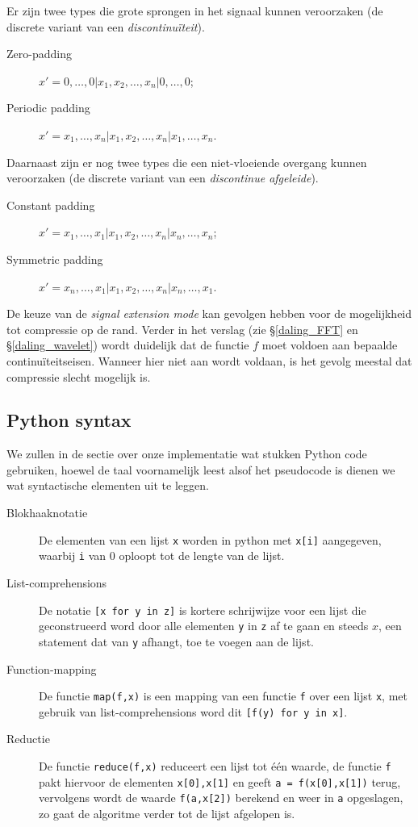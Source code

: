 Er zijn twee types die grote sprongen in het signaal kunnen veroorzaken (de discrete variant van een \emph{discontinu\"iteit}).
\begin{description}
\item[Zero-padding] $x' = 0, \ldots, 0| x_1, x_2, \ldots, x_n| 0, \ldots, 0$;
\item[Periodic padding] $x' = x_1, \ldots, x_n| x_1, x_2, \ldots, x_n| x_1, \ldots, x_n$.
\end{description}
Daarnaast zijn er nog twee types die een niet-vloeiende overgang kunnen veroorzaken (de discrete variant van een \emph{discontinue afgeleide}).
\begin{description}
\item[Constant padding] $x' = x_1, \ldots, x_1| x_1, x_2, \ldots, x_n| x_n, \ldots, x_n$;
\item[Symmetric padding] $x' = x_n, \ldots, x_1| x_1, x_2, \ldots, x_n| x_n, \ldots, x_1$.
\end{description}

De keuze van de \emph{signal extension mode} kan gevolgen hebben voor de mogelijkheid tot compressie op de rand. Verder in het verslag (zie \S \ref{daling_FFT} en \S \ref{daling_wavelet}) wordt duidelijk dat de functie $f$ moet voldoen aan bepaalde continu\"iteitseisen. Wanneer hier niet aan wordt voldaan, is het gevolg meestal dat compressie slecht mogelijk is.

\subsection{Python syntax}
\label{python}
We zullen in de sectie over onze implementatie wat stukken Python code gebruiken, hoewel de taal
voornamelijk leest alsof het pseudocode is dienen we wat syntactische elementen uit te leggen.
\begin{description}
\item[Blokhaaknotatie] De elementen van een lijst \texttt{x} worden in python met \texttt{x[i]} aangegeven,
  waarbij \texttt{i} van $0$ oploopt tot de lengte van de lijst.
\item[List-comprehensions] De notatie \texttt{[x for y in z]} is kortere schrijwijze voor een lijst die geconstrueerd
  word door alle elementen \texttt{y} in \texttt{z} af te gaan en steeds 
  $x$, een statement dat van \texttt{y} afhangt, toe te voegen aan de lijst.
\item[Function-mapping] De functie \texttt{map(f,x)} is een mapping van een functie \texttt{f} over een lijst 
  \texttt{x}, met gebruik van list-comprehensions word dit \texttt{[f(y) for y in x]}.
\item[Reductie] De functie \texttt{reduce(f,x)} reduceert een lijst tot \'e\'en waarde, de functie \texttt{f} pakt
  hiervoor de elementen \texttt{x[0],x[1]} en geeft \texttt{a = f(x[0],x[1])} terug, vervolgens wordt
  de waarde \texttt{f(a,x[2])} berekend en weer in \texttt{a} opgeslagen, zo gaat de algoritme verder tot de lijst
  afgelopen is.
\end{description}
